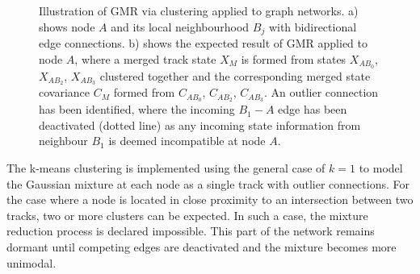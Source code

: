 \begin{figure}[htbp!] 
    \centering
    \hfill%
    \caption{Illustration of GMR via clustering applied to graph networks. a) shows node $A$ and its local neighbourhood $B_j$ with bidirectional edge connections. b) shows the expected result of GMR applied to node $A$, where a merged track state $X_M$ is formed from states $X_{AB_0}$, $X_{AB_2}$, $X_{AB_3}$ clustered together and the corresponding merged state covariance $C_M$ formed from $C_{AB_0}$, $C_{AB_2}$, $C_{AB_3}$. An outlier connection has been identified, where the incoming $B_1 - A$ edge has been deactivated (dotted line) as any incoming state information from neighbour $B_1$ is deemed incompatible at node $A$.}
    \label{fig:GMR-example}
\end{figure}

The k-means clustering is implemented using the general case of $k=1$ to model the Gaussian mixture at each node as a single track with outlier connections. For the case where a node is located in close proximity to an intersection between two tracks, two or more clusters can be expected. In such a case, the mixture reduction process is declared impossible. This part of the network remains dormant until competing edges are deactivated and the mixture becomes more unimodal. 


